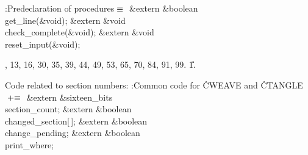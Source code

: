 \B{}:Predeclaration of procedures\X${}\equiv{}$\6
\&{extern} \&{boolean} \\{get\_line}(\&{void});\6
\&{extern} \&{void} \\{check\_complete}(\&{void});\6
\&{extern} \&{void} \\{reset\_input}(\&{void});\par
{}, 13, 16, 30, 35, 39, 44, 49, 53, 65, 70, 84, 91, 99.
\U1.\fi

Code related to section numbers:
\Y\B\4:Common code for \.{CWEAVE} and \.{CTANGLE}\X${}\mathrel+\equiv{}$\6
\&{extern} \&{sixteen\_bits} \\{section\_count};\6
\&{extern} \&{boolean} \\{changed\_section}[\,];\6
\&{extern} \&{boolean} \\{change\_pending};\6
\&{extern} \&{boolean} \\{print\_where};\par
\fi


